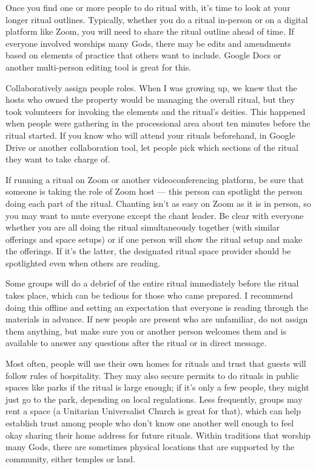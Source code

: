 \documentclass[
]{book}
\begin{document}
Once you find one or more people to do ritual with, it's time to look at your longer ritual outlines. Typically, whether you do a ritual in-person or on a digital platform like Zoom, you will need to share the ritual outline ahead of time. If everyone involved worships many Gods, there may be edits and amendments based on elements of practice that others want to include. Google Docs or another multi-person editing tool is great for this.

Collaboratively assign people roles. When I was growing up, we knew that the hosts who owned the property would be managing the overall ritual, but they took volunteers for invoking the elements and the ritual's deities. This happened when people were gathering in the processional area about ten minutes before the ritual started. If you know who will attend your rituals beforehand, in Google Drive or another collaboration tool, let people pick which sections of the ritual they want to take charge of.

If running a ritual on Zoom or another videoconferencing platform, be sure that someone is taking the role of Zoom host --- this person can spotlight the person doing each part of the ritual. Chanting isn't as easy on Zoom as it is in person, so you may want to mute everyone except the chant leader. Be clear with everyone whether you are all doing the ritual simultaneously together (with similar offerings and space setups) or if one person will show the ritual setup and make the offerings. If it's the latter, the designated ritual space provider should be spotlighted even when others are reading.

Some groups will do a debrief of the entire ritual immediately before the ritual takes place, which can be tedious for those who came prepared. I recommend doing this offline and setting an expectation that everyone is reading through the materials in advance. If new people are present who are unfamiliar, do not assign them anything, but make sure you or another person welcomes them and is available to answer any questions after the ritual or in direct message.

Most often, people will use their own homes for rituals and trust that guests will follow rules of hospitality. They may also secure permits to do rituals in public spaces like parks if the ritual is large enough; if it's only a few people, they might just go to the park, depending on local regulations. Less frequently, groups may rent a space (a Unitarian Universalist Church is great for that), which can help establish trust among people who don't know one another well enough to feel okay sharing their home address for future rituals. Within traditions that worship many Gods, there are sometimes physical locations that are supported by the community, either temples or land.
\end{document}

